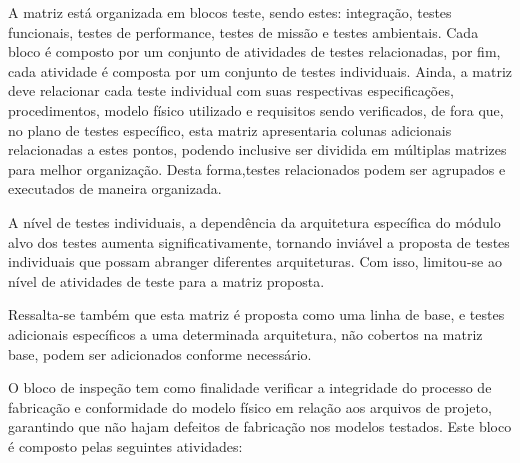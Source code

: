 A matriz está organizada em blocos teste, sendo estes: integração, testes funcionais, testes de performance, testes de missão e testes ambientais.
Cada bloco é composto por um conjunto de atividades de testes relacionadas, por fim, cada atividade é composta por um conjunto de testes individuais.
Ainda, a matriz deve relacionar cada teste individual com suas respectivas especificações, procedimentos, modelo físico utilizado e requisitos sendo verificados, de fora que, no plano de testes específico, esta matriz apresentaria colunas adicionais relacionadas a estes pontos, podendo inclusive ser dividida em múltiplas matrizes para melhor organização.
Desta forma,testes relacionados podem ser agrupados e executados de maneira organizada.

A nível de testes individuais, a dependência da arquitetura específica do módulo alvo dos testes aumenta significativamente, tornando inviável a proposta de testes individuais que possam abranger diferentes arquiteturas.
Com isso, limitou-se ao nível de atividades de teste para a matriz proposta.

Ressalta-se também que esta matriz é proposta como uma linha de base, e testes adicionais específicos a uma determinada arquitetura, não cobertos na matriz base, podem ser adicionados conforme necessário.

O bloco de inspeção tem como finalidade verificar a integridade do processo de fabricação e conformidade do modelo físico em relação aos arquivos de projeto, garantindo que não hajam defeitos de fabricação nos modelos testados.
Este bloco é composto pelas seguintes atividades:

